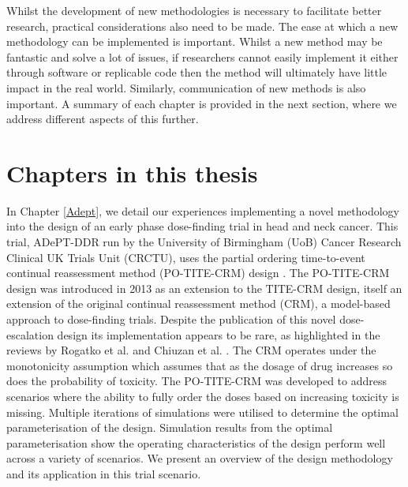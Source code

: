 Whilst the development of new methodologies is necessary to facilitate better research, practical considerations also need to be made. The ease at which a new methodology can be implemented is important. Whilst a new method may be fantastic and solve a lot of issues, if researchers cannot easily implement it either through software or replicable code then the method will ultimately have little impact in the real world. Similarly, communication of new methods is also important. A summary of each chapter is provided in the next section, where we address different aspects of this further. 
\section{Chapters in this thesis}

In Chapter \ref{Adept}, we detail our experiences implementing a novel methodology into the design of an early phase dose-finding trial in head and neck cancer. This trial, ADePT-DDR run by the University of Birmingham (UoB) Cancer Research Clinical UK Trials Unit (CRCTU), uses the partial ordering time-to-event continual reassessment method (PO-TITE-CRM) design \cite{wagesUsingTimetoeventContinual2013}. The PO-TITE-CRM design was introduced in 2013 as an extension to the TITE-CRM design, itself an extension of the original continual reassessment method (CRM), a model-based approach to dose-finding trials. Despite the publication of this novel dose-escalation design its implementation appears to be rare, as highlighted in the reviews by Rogatko et al. \cite{rogatkoTranslationInnovativeDesigns2007} and Chiuzan et al. \cite{chiuzanDosefindingDesignsTrials2017}. The CRM operates under the monotonicity assumption which assumes that as the dosage of drug increases so does the probability of toxicity. The PO-TITE-CRM was developed to address scenarios where the ability to fully order the doses based on increasing toxicity is missing. Multiple iterations of simulations were utilised to determine the optimal parameterisation of the design. Simulation results from the optimal parameterisation show the operating characteristics of the design perform well across a variety of scenarios. We present an overview of the design methodology and its application in this trial scenario.

